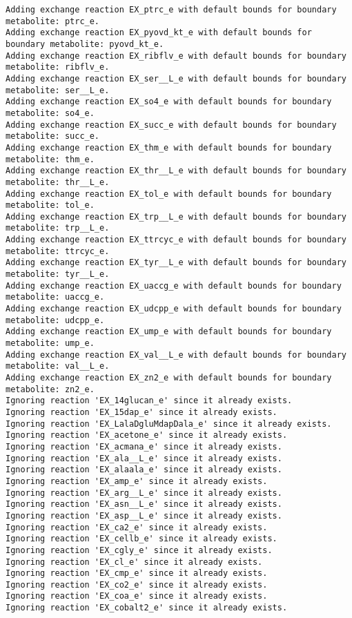 \documentclass[
  letterpaper,
  DIV=11,
  numbers=noendperiod]{scrartcl}
\begin{document}
\begin{verbatim}
Adding exchange reaction EX_ptrc_e with default bounds for boundary metabolite: ptrc_e.
Adding exchange reaction EX_pyovd_kt_e with default bounds for boundary metabolite: pyovd_kt_e.
Adding exchange reaction EX_ribflv_e with default bounds for boundary metabolite: ribflv_e.
Adding exchange reaction EX_ser__L_e with default bounds for boundary metabolite: ser__L_e.
Adding exchange reaction EX_so4_e with default bounds for boundary metabolite: so4_e.
Adding exchange reaction EX_succ_e with default bounds for boundary metabolite: succ_e.
Adding exchange reaction EX_thm_e with default bounds for boundary metabolite: thm_e.
Adding exchange reaction EX_thr__L_e with default bounds for boundary metabolite: thr__L_e.
Adding exchange reaction EX_tol_e with default bounds for boundary metabolite: tol_e.
Adding exchange reaction EX_trp__L_e with default bounds for boundary metabolite: trp__L_e.
Adding exchange reaction EX_ttrcyc_e with default bounds for boundary metabolite: ttrcyc_e.
Adding exchange reaction EX_tyr__L_e with default bounds for boundary metabolite: tyr__L_e.
Adding exchange reaction EX_uaccg_e with default bounds for boundary metabolite: uaccg_e.
Adding exchange reaction EX_udcpp_e with default bounds for boundary metabolite: udcpp_e.
Adding exchange reaction EX_ump_e with default bounds for boundary metabolite: ump_e.
Adding exchange reaction EX_val__L_e with default bounds for boundary metabolite: val__L_e.
Adding exchange reaction EX_zn2_e with default bounds for boundary metabolite: zn2_e.
Ignoring reaction 'EX_14glucan_e' since it already exists.
Ignoring reaction 'EX_15dap_e' since it already exists.
Ignoring reaction 'EX_LalaDgluMdapDala_e' since it already exists.
Ignoring reaction 'EX_acetone_e' since it already exists.
Ignoring reaction 'EX_acmana_e' since it already exists.
Ignoring reaction 'EX_ala__L_e' since it already exists.
Ignoring reaction 'EX_alaala_e' since it already exists.
Ignoring reaction 'EX_amp_e' since it already exists.
Ignoring reaction 'EX_arg__L_e' since it already exists.
Ignoring reaction 'EX_asn__L_e' since it already exists.
Ignoring reaction 'EX_asp__L_e' since it already exists.
Ignoring reaction 'EX_ca2_e' since it already exists.
Ignoring reaction 'EX_cellb_e' since it already exists.
Ignoring reaction 'EX_cgly_e' since it already exists.
Ignoring reaction 'EX_cl_e' since it already exists.
Ignoring reaction 'EX_cmp_e' since it already exists.
Ignoring reaction 'EX_co2_e' since it already exists.
Ignoring reaction 'EX_coa_e' since it already exists.
Ignoring reaction 'EX_cobalt2_e' since it already exists.

\end{verbatim}
\end{document}
